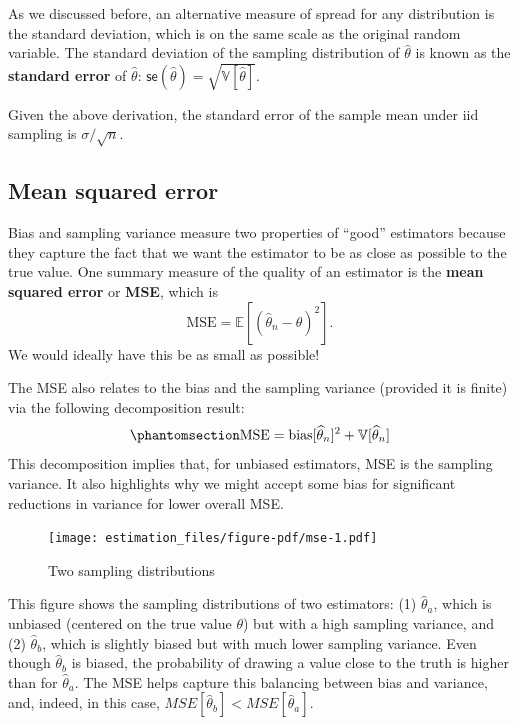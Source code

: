 \documentclass[
  13pt,
  letterpaper,
  DIV=11,
  numbers=noendperiod]{scrreprt}
\newcommand{\E}{\mathbb{E}}
\newcommand{\V}{\mathbb{V}}
\newcommand{\se}{\textsf{se}}
\theoremstyle{definition}
\theoremstyle{definition}
\theoremstyle{plain}
\theoremstyle{remark}
\begin{document}
As we discussed before, an alternative measure of spread for any
distribution is the standard deviation, which is on the same scale as
the original random variable. The standard deviation of the sampling
distribution of \(\widehat{\theta}\) is known as the \textbf{standard
error} of \(\widehat{\theta}\):
\(\se(\widehat{\theta}) = \sqrt{\V[\widehat{\theta}]}\).

Given the above derivation, the standard error of the sample mean under
iid sampling is \(\sigma / \sqrt{n}\).

\subsection{Mean squared error}\label{mean-squared-error}

Bias and sampling variance measure two properties of ``good'' estimators
because they capture the fact that we want the estimator to be as close
as possible to the true value. One summary measure of the quality of an
estimator is the \textbf{mean squared error} or \textbf{MSE}, which is\\
\[
\text{MSE} = \E[(\widehat{\theta}_n-\theta)^2].
\] We would ideally have this be as small as possible!

The MSE also relates to the bias and the sampling variance (provided it
is finite) via the following decomposition result:
\begin{equation}\phantomsection\label{eq-mse-decomposition}{
\text{MSE} = \text{bias}[\widehat{\theta}_n]^2 + \V[\widehat{\theta}_n]
}\end{equation} This decomposition implies that, for unbiased
estimators, MSE is the sampling variance. It also highlights why we
might accept some bias for significant reductions in variance for lower
overall MSE.

\begin{figure}[th]

{\centering \texttt{[image: estimation\_files/figure-pdf/mse-1.pdf]}

}

\caption{Two sampling distributions}

\end{figure}%

This figure shows the sampling distributions of two estimators: (1)
\(\widehat{\theta}_a\), which is unbiased (centered on the true value
\(\theta\)) but with a high sampling variance, and (2)
\(\widehat{\theta}_b\), which is slightly biased but with much lower
sampling variance. Even though \(\widehat{\theta}_b\) is biased, the
probability of drawing a value close to the truth is higher than for
\(\widehat{\theta}_a\). The MSE helps capture this balancing between
bias and variance, and, indeed, in this case,
\(MSE[\widehat{\theta}_b] < MSE[\widehat{\theta}_a]\).
\end{document}
